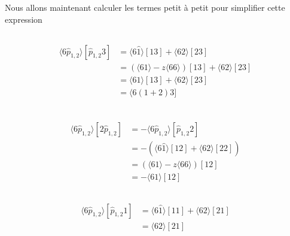 \documentclass[12pt, a4paper]{article}
\begin{document}
		Nous allons maintenant calculer les termes petit à petit pour simplifier cette expression
		
		\subsection{}
		\begin{equation}
			\begin{split}
				\langle 6 \hat{p}_{1,2} \rangle [\hat{p}_{1,2}3]
				&=\langle 6 \hat{1} \rangle [13] + \langle 62 \rangle [23]\\
				&=(\langle 61 \rangle -z \langle 66 \rangle)[13]+ \langle 62 \rangle [23]\\
				&=\langle 61 \rangle [13] + \langle 62 \rangle [23]\\
				&=\langle 6(1+2)3] \\
			\end{split}
		\end{equation}
		
		\subsection{}
		\begin{equation}
			\begin{split}
				\langle 6 \hat{p}_{1,2} \rangle [2\hat{p}_{1,2}]
				&=-\langle 6 \hat{p}_{1,2} \rangle [\hat{p}_{1,2}2]\\
				&=-(\langle 6 \hat{1} \rangle[12] + \langle 62 \rangle [22])\\
				&=(\langle 61 \rangle - z \langle 66 \rangle)[12]\\
				&=- \langle 61 \rangle [12]
			\end{split}
		\end{equation}
		
		\subsection{}
		\begin{equation}
			\begin{split}
				\langle 6 \hat{p}_{1,2} \rangle [\hat{p}_{1,2}1]
				&=\langle 6 \hat{1} \rangle [11] + \langle 62 \rangle [21] \\
				&=\langle 62 \rangle [21]
			\end{split}
		\end{equation}
		
\end{document}
